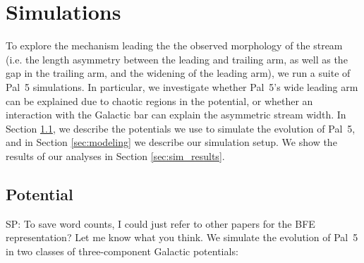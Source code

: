 \documentclass[twocolumn]{aastex62}
\newcommand{\sa}[1]{{\color{magenta} SP: #1}}
\begin{document}
\section{Simulations}
\label{sec:sim}
To explore the mechanism leading the the observed morphology of the stream (i.e. the length asymmetry between the leading and trailing arm, as well as the gap in the trailing arm, and the widening of the leading arm), we run a suite of Pal~5 simulations.
In particular, we investigate whether Pal~5's wide leading arm can be explained due to chaotic regions in the potential, or whether an interaction with the Galactic bar can explain the asymmetric stream width. 
In Section \ref{sec:potential}, we describe the potentials we use to simulate the evolution of Pal~5, and in Section \ref{sec:modeling} we describe our simulation setup.
We show the results of our analyses in Section \ref{sec:sim_results}.

\subsection{Potential}
\label{sec:potential}
\sa{To save word counts, I could just refer to other papers for the BFE representation? Let me know what you think.}
We simulate the evolution of Pal~5 in two classes of three-component Galactic potentials:
\end{document}
